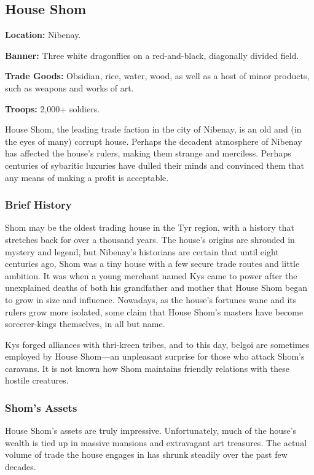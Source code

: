 \subsection{House Shom}
\textbf{Location:} Nibenay.

\textbf{Banner:} Three white dragonflies on a red-and-black, diagonally divided field.

\textbf{Trade Goods:} Obsidian, rice, water, wood, as well as a host of minor products, such as weapons and works of art.

\textbf{Troops:} 2,000+ soldiers.

House Shom, the leading trade faction in the city of Nibenay, is an old and (in the eyes of many) corrupt house. Perhaps the decadent atmosphere of Nibenay has affected the house's rulers, making them strange and merciless. Perhaps centuries of sybaritic luxuries have dulled their minds and convinced them that any means of making a profit is acceptable.

\subsubsection{Brief History}
Shom may be the oldest trading house in the Tyr region, with a history that stretches back for over a thousand years. The house's origins are shrouded in mystery and legend, but Nibenay's historians are certain that until eight centuries ago, Shom was a tiny house with a few secure trade routes and little ambition. It was when a young merchant named Kys came to power after the unexplained deaths of both his grandfather and mother that House Shom began to grow in size and influence. Nowadays, as the house's fortunes wane and its rulers grow more isolated, some claim that House Shom's masters have become sorcerer-kings themselves, in all but name.

Kys forged alliances with thri-kreen tribes, and to this day, belgoi are sometimes employed by House Shom---an unpleasant surprise for those who attack Shom's caravans. It is not known how Shom maintains friendly relations with these hostile creatures.


\subsubsection{Shom's Assets}
House Shom's assets are truly impressive. Unfortunately, much of the house's wealth is tied up in massive mansions and extravagant art treasures. The actual volume of trade the house engages in has shrunk steadily over the past few decades.

